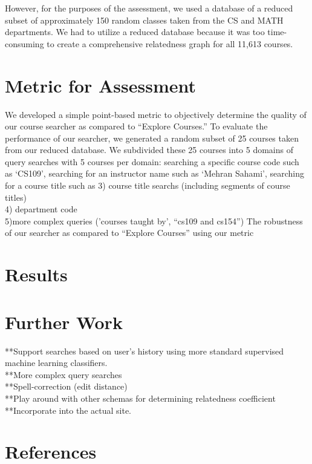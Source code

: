 \documentclass[12pt]{article}
\begin{document}
	 However, for the purposes of the assessment, we used a database of a reduced subset of approximately 150 random classes taken from the CS and MATH departments. We had to utilize a reduced database because it was too time-consuming to create a comprehensive relatedness graph for all 11,613 courses.

\section*{Metric for Assessment}
	We developed a simple point-based metric to objectively determine the quality of our course searcher as compared to ``Explore Courses.'' To evaluate the performance of our searcher, we generated a random subset of 25 courses taken from our reduced database. We subdivided these 25 courses into 5 domains of query searches with 5 courses per domain: searching a specific course code such as `CS109', searching for an instructor name such as `Mehran Sahami', searching for a course title such as 
3) course title searchs (including segments of course titles)\\
4) department code\\
5)more complex queries ('courses taught by', ``cs109 and cs154'')
	The robustness of our searcher as compared to ``Explore Courses'' using our metric 
\section*{Results}
	
\section*{Further Work}
**Support searches based on user's history using more standard supervised machine learning classifiers.\\
	**More complex query searches\\
	**Spell-correction (edit distance)\\
	**Play around with other schemas for determining relatedness coefficient\\
	**Incorporate into the actual site.\\

\section*{References}
\end{document}
